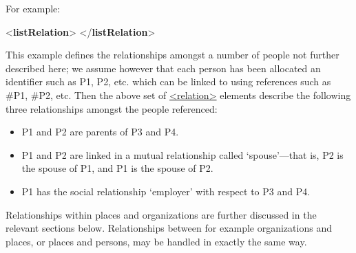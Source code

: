 For example: \par\bgroup{}\exampleFont \begin{shaded}\noindent\mbox{}{<\textbf{listRelation}>}\mbox{}\newline 
{}\mbox{}\newline 
{}\mbox{}\newline 
{}\mbox{}\newline 
{</\textbf{listRelation}>}\end{shaded}\egroup\par \noindent  This example defines the relationships amongst a number of people not further described here; we assume however that each person has been allocated an identifier such as P1, P2, etc. which can be linked to using references such as \#P1, \#P2, etc. Then the above set of \hyperref[TEI.relation]{<relation>} elements describe the following three relationships amongst the people referenced: \begin{itemize}
\item P1 and P2 are parents of P3 and P4.
\item P1 and P2 are linked in a mutual relationship called ‘spouse’—that is, P2 is the spouse of P1, and P1 is the spouse of P2.
\item P1 has the social relationship ‘employer’ with respect to P3 and P4.
\end{itemize} \par
Relationships within places and organizations are further discussed in the relevant sections below. Relationships between for example organizations and places, or places and persons, may be handled in exactly the same way. 
